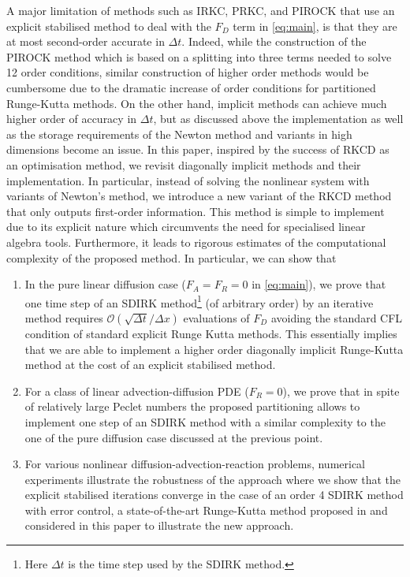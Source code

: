 \documentclass[10pt,a4paper]{article}
\begin{document}
A major limitation of methods such as IRKC, PRKC, and PIROCK that use an explicit stabilised method to deal with the $F_{D}$ term in \eqref{eq:main}, is that they {are} at most second-order accurate in $\Delta t$. {Indeed, while the construction of the PIROCK method which is based on a splitting into three terms needed to solve 12 order conditions, similar construction of higher order methods would be cumbersome due to the dramatic increase of order conditions for partitioned Runge-Kutta methods. }
On the other hand, implicit methods can achieve 
much higher order of accuracy in $\Delta t$, 
but as discussed above the implementation as 
well as the storage requirements of {the Newton 
method and variants} in high dimensions become an issue.  
In this paper, inspired by the success of RKCD 
as an optimisation method, we revisit diagonally implicit 
methods and their implementation. In 
particular, instead of solving the nonlinear 
system with variants of Newton's method, we 
introduce a new variant of the RKCD method 
that only {outputs} first-order information.  This method is simple to implement due to its explicit nature which circumvents the 
need for specialised linear algebra tools.
Furthermore,  it leads to rigorous estimates of the computational complexity of the proposed method. In particular, we can show that
\begin{enumerate}
\item In the pure linear diffusion case ($F_{A}=F_{R}=0$ in \eqref{eq:main}), { we prove that one time step} of an {SDIRK} method\footnote{ Here $\Delta t$ is the time step used by the {SDIRK} method.} (of arbitrary order) by an iterative method requires  $\mathcal{O}(\sqrt{\Delta t}/\Delta x)$ evaluations of $F_{D}$ avoiding the standard CFL condition of standard explicit Runge Kutta methods. This essentially implies that we are able to implement a higher order diagonally implicit Runge-Kutta method at the cost of an explicit stabilised method. 
\item {For a class of linear advection-diffusion PDE ($F_{R}=0$), we prove that in spite of relatively large Peclet numbers the proposed partitioning allows to implement one step of an SDIRK method with a similar complexity to the one of the pure diffusion case discussed at the previous point}.
\item {For various nonlinear diffusion-advection-reaction problems, numerical experiments illustrate the robustness of the approach where we show that the explicit stabilised iterations converge in the case of an order 4 SDIRK method with error control, a state-of-the-art Runge-Kutta method proposed in \cite[Table IV.6.5, p. 100]{HaW96} and considered in this paper to illustrate the new approach.}
\end{enumerate}
\end{document}
